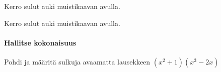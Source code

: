 \begin{tehtavasivu}
\begin{tehtava}
    Kerro sulut auki muistikaavan avulla.
    \begin{alakohdat}
    \end{alakohdat}
    \begin{vastaus}
        \begin{alakohdat}
        \end{alakohdat}
    \end{vastaus}
\end{tehtava}

\begin{tehtava}
    Kerro sulut auki muistikaavan avulla.
    \begin{alakohdat}
    \end{alakohdat}
    \begin{vastaus}
        \begin{alakohdat}
        \end{alakohdat}
    \end{vastaus}
\end{tehtava}


\paragraph*{Hallitse kokonaisuus}

\begin{tehtava}
    Pohdi ja määritä sulkuja avaamatta lausekkeen $(x^2+1)(x^3-2x)$
    \begin{alakohdat}
    \end{alakohdat}
    \begin{vastaus}
        \begin{alakohdat}
        \end{alakohdat}
    \end{vastaus}
\end{tehtava}


\end{tehtavasivu}
